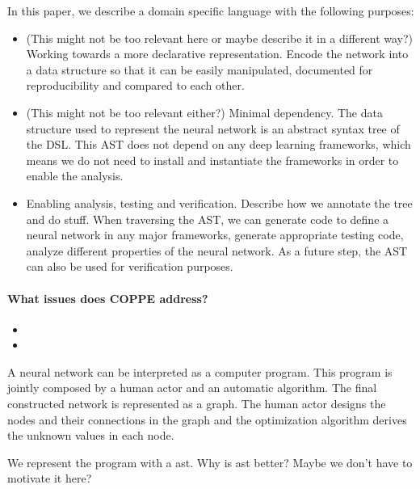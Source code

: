 In this paper, we describe a domain specific language with the following purposes:
\begin{itemize}
\item (This might not be too relevant here or maybe describe it in a
  different way?) Working towards a more declarative
  representation. Encode the network into a data structure so that it
  can be easily manipulated, documented for reproducibility and
  compared to each other.
\item (This might not be too relevant either?) Minimal dependency. The
  data structure used to represent the neural network is an abstract
  syntax tree of the DSL. This AST does not depend on any deep
  learning frameworks, which means we do not need to install and
  instantiate the frameworks in order to enable the analysis.
\item Enabling analysis, testing and verification. Describe how we
  annotate the tree and do stuff. When traversing the AST, we can
  generate code to define a neural network in any major frameworks,
  generate appropriate testing code, analyze different properties of
  the neural network. As a future step, the AST can also be used for
  verification purposes.
\end{itemize}


\paragraph{What issues does COPPE address?}
\begin{itemize}
\item
\item
\end{itemize}



A neural network can be interpreted as a computer program. This program is jointly composed by a human actor and an automatic algorithm. The final constructed network is represented as a graph.
The human actor designs the nodes and their connections in the graph and the optimization algorithm derives the unknown values in each node.

We represent the program with a ast. Why is ast better? Maybe we don't have to motivate it here?




